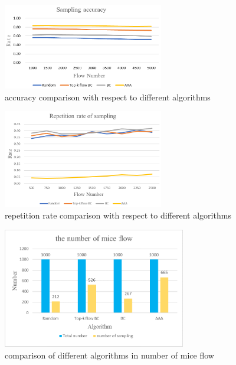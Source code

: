 \documentclass[conference]{IEEEtran}
\begin{document}
\begin{figure}[!hhhhhhhhhht]
\centering
\includegraphics[width=7cm]{images/cmp_sam_accu.png}
\caption{accuracy comparison with respect to different algorithms}
\label{aaa.png}
\end{figure}
\begin{figure}[!hhhhhhhhhht]
\centering
\includegraphics[width=7cm]{images/cmp_rep_rate.png}
\caption{repetition rate comparison with respect to different algorithms}
\label{aaa.png}
\end{figure}



\begin{figure}[!hhhhhhhhhht]
\centering
\includegraphics[width=8cm]{images/cmp_mice_flownum.png}
\caption{comparison of different algorithms in number of mice flow}
\label{aaa.png}
\end{figure}
\end{document}
